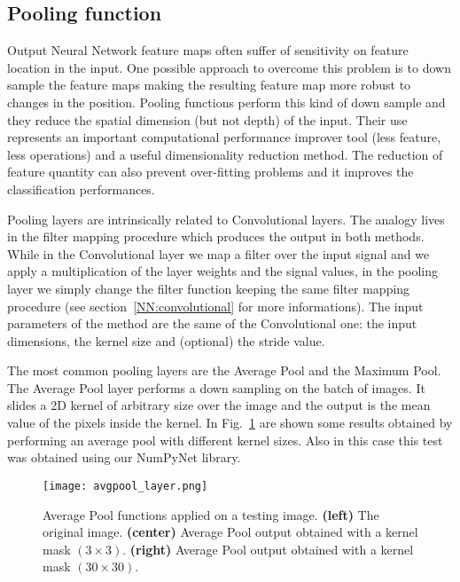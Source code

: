 \documentclass{standalone}
\begin{document}
\subsection[Pooling function]{Pooling function}\label{NN:pooling}

Output Neural Network feature maps often suffer of sensitivity on feature location in the input.
One possible approach to overcome this problem is to down sample the feature maps making the resulting feature map more robust to changes in the position.
Pooling functions perform this kind of down sample and they reduce the spatial dimension (but not depth) of the input.
Their use represents an important computational performance improver tool (less feature, less operations) and a useful dimensionality reduction method.
The reduction of feature quantity can also prevent over-fitting problems and it improves the classification performances.

Pooling layers are intrinsically related to Convolutional layers.
The analogy lives in the filter mapping procedure which produces the output in both methods.
While in the Convolutional layer we map a filter over the input signal and we apply a multiplication of the layer weights and the signal values, in the pooling layer we simply change the filter function keeping the same filter mapping procedure (see section~\ref{NN:convolutional} for more informations).
The input parameters of the method are the same of the Convolutional one: the input dimensions, the kernel size and (optional) the stride value.

The most common pooling layers are the Average Pool and the Maximum Pool.
The Average Pool layer performs a down sampling on the batch of images.
It slides a 2D kernel of arbitrary size over the image and the output is the mean value of the pixels inside the kernel.
In Fig.~\ref{fig:avgpool} are shown some results obtained by performing an average pool with different kernel sizes.
Also in this case this test was obtained using our NumPyNet library.

\begin{center}
\begin{figure}[htbp]
\centering
\texttt{[image: avgpool\_layer.png]}
\caption{Average Pool functions applied on a testing image.
\textbf{(left)} The original image.
\textbf{(center)} Average Pool output obtained with a kernel mask $(3\times 3)$.
\textbf{(right)} Average Pool output obtained with a kernel mask $(30\times 30)$.
}
\label{fig:avgpool}
\end{figure}
\end{center}
\end{document}
